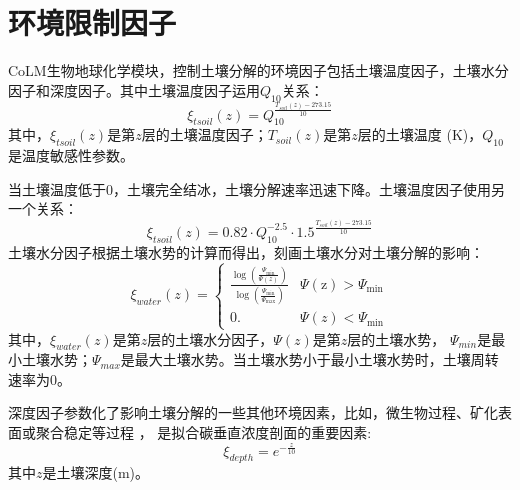 \section{环境限制因子}\label{环境限制因子}
CoLM生物地球化学模块，控制土壤分解的环境因子包括土壤温度因子，土壤水分因子和深度因子。其中土壤温度因子运用$Q_{10}$关系：
\begin{equation}
\xi_{t s o i l}(z)=Q_{10}^{\frac{T_{{soil }}(z)-273.15}{10}}
\end{equation}
其中，$\xi_{tsoil}\left(z\right)$是第$z$层的土壤温度因子；$T_{soil}\left(z\right)$是第$z$层的土壤温度 (K)，$Q_{10}$是温度敏感性参数。


当土壤温度低于0\textcelsium，土壤完全结冰，土壤分解速率迅速下降。土壤温度因子使用另一个关系：
\begin{equation}
\xi_{t s o i l}(z)=0.82 \cdot Q_{10}^{-2.5} \cdot 1.5^{\frac{T_{{soil }}(z)-273.15}{10}}
\end{equation}
土壤水分因子根据土壤水势的计算而得出，刻画土壤水分对土壤分解的影响：
\begin{equation}
\xi_{w a t e r}(z)=\left\{\begin{array}{ll}\frac{\log \left(\frac{\Psi_{\min }}{\Psi(z)}\right)}{\log \left(\frac{\Psi_{\min }}{\Psi_{\max }}\right)} 
    & \Psi(\mathrm{z})>\Psi_{\min } \\ 0 . & \Psi(z)<\Psi_{\min }\end{array}\right.
\end{equation}
其中，$\xi_{water}\left(z\right)$是第$z$层的土壤水分因子，$\Psi\left(z\right)$是第$z$层的土壤水势，
$\Psi_{min}$是最小土壤水势；$\Psi_{max}$是最大土壤水势。当土壤水势小于最小土壤水势时，土壤周转速率为0。


深度因子参数化了影响土壤分解的一些其他环境因素，比如，微生物过程、矿化表面或聚合稳定等过程 \citep{koven2013effect}，
是拟合碳垂直浓度剖面的重要因素\citep{jenkinson2008turnover}:
\begin{equation}
\xi_{d e p t h}=e^{-\frac{z}{10}}
\end{equation}
其中$z$是土壤深度(m)。

